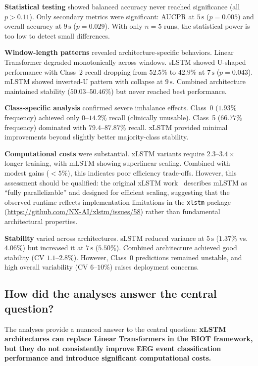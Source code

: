 \textbf{Statistical testing} showed balanced accuracy never reached significance (all $p > 0.11$). Only secondary metrics were significant: AUCPR at $5\,\text{s}$ ($p=0.005$) and overall accuracy at $9\,\text{s}$ ($p=0.029$). With only $n=5$ runs, the statistical power is too low to detect small differences.

\textbf{Window-length patterns} revealed architecture-specific behaviors. Linear Transformer degraded monotonically across windows. \ac{sLSTM} showed U-shaped performance with Class~2 recall dropping from $52.5\%$ to $42.9\%$ at $7\,\text{s}$ ($p=0.043$). \ac{mLSTM} showed inverted-U pattern with collapse at $9\,\text{s}$. Combined architecture maintained stability ($50.03$--$50.46\%$) but never reached best performance.

\textbf{Class-specific analysis} confirmed severe imbalance effects. Class~0 ($1.93\%$ frequency) achieved only $0$--$14.2\%$ recall (clinically unusable). Class~5 ($66.77\%$ frequency) dominated with $79.4$--$87.87\%$ recall. \ac{xLSTM} provided minimal improvements beyond slightly better majority-class stability.

\textbf{Computational costs} were substantial. \ac{xLSTM} variants require $2.3$--$3.4\times$ longer training, with \ac{mLSTM} showing superlinear scaling. Combined with modest gains ($<5\%$), this indicates poor efficiency trade-offs. However, this assessment should be qualified: the original \ac{xLSTM} work~\cite{beck2024xlstm} describes \ac{mLSTM} as ``fully parallelizable'' and designed for efficient scaling, suggesting that the observed runtime reflects implementation limitations in the \texttt{xlstm} package (\url{https://github.com/NX-AI/xlstm/issues/58}) rather than fundamental architectural properties.

\textbf{Stability} varied across architectures. \ac{sLSTM} reduced variance at $5\,\text{s}$ ($1.37\%$ vs. $4.06\%$) but increased it at $7\,\text{s}$ ($5.50\%$). Combined architecture achieved good stability (CV $1.1$--$2.8\%$). However, Class~0 predictions remained unstable, and high overall variability (CV $6$--$10\%$) raises deployment concerns.

\subsection{How did the analyses answer the central question?}

The analyses provide a nuanced answer to the central question: \textbf{\ac{xLSTM} architectures can replace Linear Transformers in the \ac{BIOT} framework, but they do not consistently improve \ac{EEG} event classification performance and introduce significant computational costs.}

